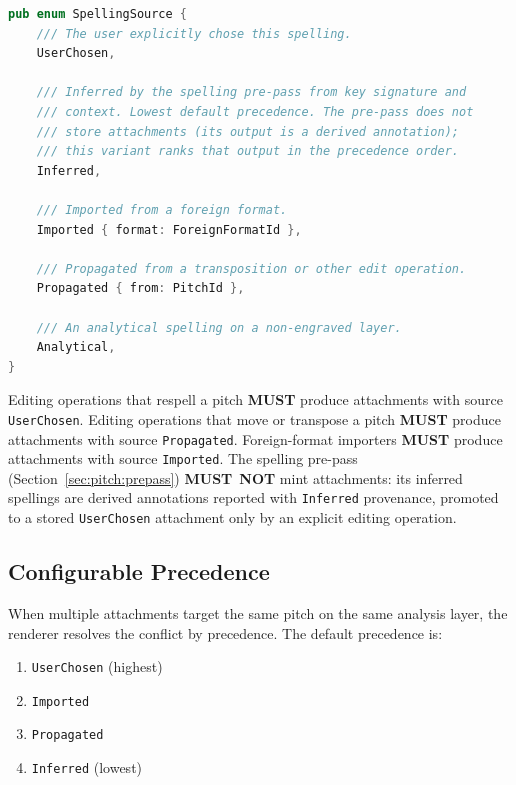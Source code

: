 \documentclass[11pt,letterpaper]{report}
\newcounter{requirement}[chapter]
\newcommand{\MUST}{\textbf{MUST}}
\newcommand{\MUSTNOT}{\textbf{MUST}\nobreak\ \textbf{NOT}}
\begin{document}
\begin{lstlisting}[language=Rust]
pub enum SpellingSource {
    /// The user explicitly chose this spelling.
    UserChosen,

    /// Inferred by the spelling pre-pass from key signature and
    /// context. Lowest default precedence. The pre-pass does not
    /// store attachments (its output is a derived annotation);
    /// this variant ranks that output in the precedence order.
    Inferred,

    /// Imported from a foreign format.
    Imported { format: ForeignFormatId },

    /// Propagated from a transposition or other edit operation.
    Propagated { from: PitchId },

    /// An analytical spelling on a non-engraved layer.
    Analytical,
}
\end{lstlisting}

\begin{requirement}
  \label{req:pitch:spelling-provenance}
  Editing operations that respell a pitch \MUST{} produce attachments
  with source \texttt{UserChosen}. Editing operations that move or
  transpose a pitch \MUST{} produce attachments with source
  \texttt{Propagated}. Foreign-format importers \MUST{} produce
  attachments with source \texttt{Imported}. The spelling pre-pass
  (Section~\ref{sec:pitch:prepass}) \MUSTNOT{} mint attachments: its
  inferred spellings are derived annotations reported with
  \texttt{Inferred} provenance, promoted to a stored
  \texttt{UserChosen} attachment only by an explicit editing
  operation.
\end{requirement}

\subsection{Configurable Precedence}
\label{sec:pitch:precedence}

When multiple attachments target the same pitch on the same analysis
layer, the renderer resolves the conflict by precedence. The default
precedence is:

\begin{enumerate}
  \item \texttt{UserChosen} (highest)
  \item \texttt{Imported}
  \item \texttt{Propagated}
  \item \texttt{Inferred} (lowest)
\end{enumerate}
\end{document}
